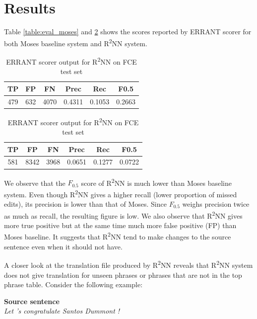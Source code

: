 \documentclass[12pt,a4paper,twoside,openright]{report}
\begin{document}
\section{Results}\label{section:results}
Table \ref{table:eval_moses} and \ref{table:eval_r2nn} shows the scores reported by ERRANT scorer for both Moses baseline system and R\textsuperscript{2}NN system.

\begin{table}[ht]
    \centering
    \begin{tabular}{ |c|c|c|c|c|c| } 
     \hline
     TP & FP & FN & Prec & Rec & F0.5 \\ [0.5ex] 
     \hline
     479 & 632 & 4070 & 0.4311 & 0.1053 & 0.2663 \\ 
     \hline
    \end{tabular}
    \caption{ERRANT scorer output for Moses on FCE test set}
    \label{table:eval_moses}
    
    \vspace{1em}
    
    \begin{tabular}{ |c|c|c|c|c|c| } 
     \hline
     TP & FP & FN & Prec & Rec & F0.5 \\ [0.5ex] 
     \hline
     581 & 8342 & 3968 & 0.0651 & 0.1277 & 0.0722 \\ 
     \hline
    \end{tabular}
    \caption{ERRANT scorer output for R\textsuperscript{2}NN on FCE test set}
    \label{table:eval_r2nn}
\end{table}

We observe that the $F_{0.5}$ score of R\textsuperscript{2}NN is much lower than Moses baseline system. Even though R\textsuperscript{2}NN gives a higher recall (lower proportion of missed edits), its precision is lower than that of Moses. Since $F_{0.5}$ weighs precision twice as much as recall, the resulting figure is low. We also observe that R\textsuperscript{2}NN gives more true positive but at the same time much more false positive (FP) than Moses baseline. It suggests that R\textsuperscript{2}NN tend to make changes to the source sentence even when it should not have. 

A closer look at the translation file produced by R\textsuperscript{2}NN reveals that R\textsuperscript{2}NN system does not give translation for unseen phrases or phrases that are not in the top phrase table. Consider the following example:

\textbf{Source sentence}\\
\textit{Let 's congratulate Santos Dummont !}
\end{document}
